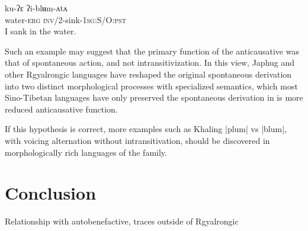 \documentclass[oldfontcommands,oneside,a4paper,11pt]{article}
\newcommand{\ipa}[1]{{\phon \mbox{#1}}} %
\begin{document}
\begin{exe}
\ex \label{ex:iblumata}
\gll
\ipa{ku-ʔɛ} \ipa{ʔi-blʉm-ʌtʌ} \\
water-\textsc{erg} \textsc{inv/2}-sink-\textsc{1sg:S/O:pst}\\
\glt I sank in the water.
\end{exe}

Such an example may suggest that the primary function of the anticausative was that of spontaneous action, and not intransitivization. In this view, Japhug and other Rgyalrongic languages have reshaped the original spontaneous derivation into two distinct morphological processes with specialized semantics, which most Sino-Tibetan languages have only preserved the spontaneous derivation in is more reduced anticausative function. 

If this hypothesis is correct, more examples such as Khaling \ipa{|plum|} vs \ipa{|blum|}, with voicing alternation without intransitivation, should be discovered in morphologically rich languages of the family.

\section{Conclusion}


Relationship with autobenefactive, traces outside of Rgyalrongic




 
\end{document}
